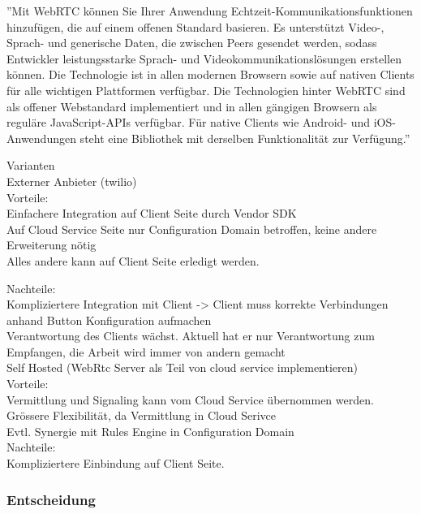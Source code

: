 ''Mit WebRTC können Sie Ihrer Anwendung Echtzeit-Kommunikationsfunktionen hinzufügen, die auf einem offenen Standard basieren.
Es unterstützt Video-, Sprach- und generische Daten, die zwischen Peers gesendet werden, sodass Entwickler leistungsstarke Sprach- und Videokommunikationslösungen erstellen können.
Die Technologie ist in allen modernen Browsern sowie auf nativen Clients für alle wichtigen Plattformen verfügbar.
Die Technologien hinter WebRTC sind als offener Webstandard implementiert und in allen gängigen Browsern als reguläre JavaScript-APIs verfügbar.
Für native Clients wie Android- und iOS-Anwendungen steht eine Bibliothek mit derselben Funktionalität zur Verfügung.''\cite{webrtc}


Varianten \\
Externer Anbieter (twilio) \\

Vorteile: \\

Einfachere Integration auf Client Seite durch Vendor SDK \\
Auf Cloud Service Seite nur Configuration Domain betroffen, keine andere Erweiterung nötig \\
Alles andere kann auf Client Seite erledigt werden.


Nachteile: \\
Kompliziertere Integration mit Client -> Client muss korrekte Verbindungen anhand Button Konfiguration aufmachen \\
Verantwortung des Clients wächst. Aktuell hat er nur Verantwortung zum Empfangen, die Arbeit wird immer von andern gemacht \\


Self Hosted (WebRtc Server als Teil von cloud service implementieren) \\

Vorteile: \\

Vermittlung und Signaling kann vom Cloud Service übernommen werden. \\
Grössere Flexibilität, da Vermittlung in Cloud Serivce \\
Evtl. Synergie mit Rules Engine in Configuration Domain \\

Nachteile: \\

Kompliziertere Einbindung auf Client Seite.


\subsubsection{Entscheidung}


